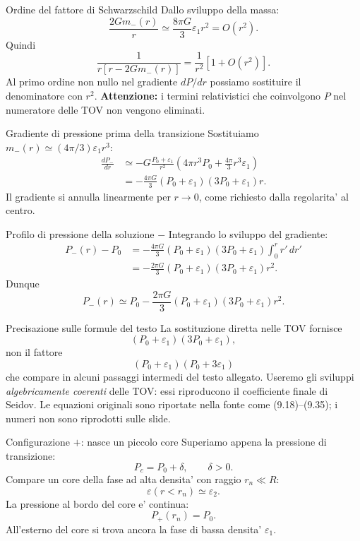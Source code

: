 \begin{frame}{Ordine del fattore di Schwarzschild}
\small
Dallo sviluppo della massa:
\[
\frac{2Gm_-(r)}r\simeq
\frac{8\pi G}{3}\varepsilon_1r^2=O(r^2).
\]
Quindi
\[
\frac{1}{r[r-2Gm_-(r)]}
=\frac{1}{r^2}\left[1+O(r^2)\right].
\]
Al primo ordine non nullo nel gradiente $dP/dr$ possiamo
sostituire il denominatore con $r^2$.
\medskip
\textbf{Attenzione:} i termini relativistici che coinvolgono $P$
nel numeratore delle TOV non vengono eliminati.
\end{frame}

\begin{frame}{Gradiente di pressione prima della transizione}
\small
Sostituiamo $m_-(r)\simeq(4\pi/3)\varepsilon_1r^3$:
\[
\begin{aligned}
\frac{dP_-}{dr}&\simeq-G\frac{P_0+\varepsilon_1}{r^2}
\left(4\pi r^3P_0+\frac{4\pi}{3}r^3\varepsilon_1\right)\\
&=-\frac{4\pi G}{3}(P_0+\varepsilon_1)
(3P_0+\varepsilon_1)r.
\end{aligned}
\]
Il gradiente si annulla linearmente per $r\to0$, come richiesto
dalla regolarita' al centro.
\end{frame}

\begin{frame}{Profilo di pressione della soluzione $-$}
\small
Integrando lo sviluppo del gradiente:
\[
\begin{aligned}
P_-(r)-P_0
&=-\frac{4\pi G}{3}(P_0+\varepsilon_1)
(3P_0+\varepsilon_1)\int_0^r r'\,dr'\\
&=-\frac{2\pi G}{3}(P_0+\varepsilon_1)
(3P_0+\varepsilon_1)r^2.
\end{aligned}
\]
Dunque
\[
P_-(r)\simeq P_0-\frac{2\pi G}{3}
(P_0+\varepsilon_1)(3P_0+\varepsilon_1)r^2.
\]
\end{frame}

\begin{frame}{Precisazione sulle formule del testo}
\small
La sostituzione diretta nelle TOV fornisce
\[
(P_0+\varepsilon_1)(3P_0+\varepsilon_1),
\]
non il fattore
\[
(P_0+\varepsilon_1)(P_0+3\varepsilon_1)
\]
che compare in alcuni passaggi intermedi del testo allegato.
\medskip
Useremo gli sviluppi \emph{algebricamente coerenti} delle TOV:
essi riproducono il coefficiente finale di Seidov.
\medskip
Le equazioni originali sono riportate nella fonte come
(9.18)--(9.35); i numeri non sono riprodotti sulle slide.
\end{frame}

\begin{frame}{Configurazione $+$: nasce un piccolo core}
\small
Superiamo appena la pressione di transizione:
\[
P_c=P_0+\delta,\qquad\delta>0.
\]
Compare un core della fase ad alta densita' con raggio $r_n\ll R$:
\[
\varepsilon(r<r_n)\simeq\varepsilon_2.
\]
La pressione al bordo del core e' continua:
\[
P_+(r_n)=P_0.
\]
All'esterno del core si trova ancora la fase di bassa densita'
$\varepsilon_1$.
\end{frame}

